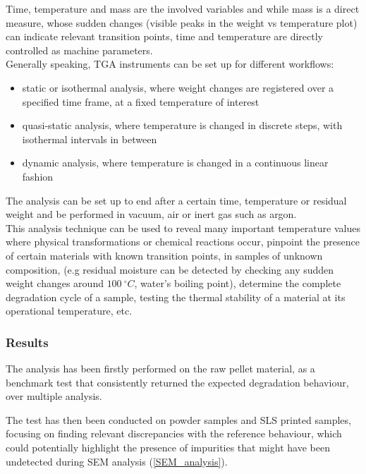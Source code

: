 \documentclass{article}
\begin{document}
        Time, temperature and mass are the involved variables and while mass is a direct measure, whose sudden changes (visible peaks
        in the weight vs temperature plot) can indicate relevant transition points, time and temperature are directly controlled 
        as machine parameters. \\ 

        Generally speaking, TGA instruments can be set up for different workflows: 

                \begin{itemize}
                    \item static or isothermal analysis, where weight changes are registered over a specified time frame, 
                    at a fixed temperature of interest
                    \item quasi-static analysis, where temperature is changed in discrete steps, with isothermal intervals in between 
                    \item dynamic analysis, where temperature is changed in a continuous linear fashion
                \end{itemize}

            The analysis can be set up to end after a certain time, temperature or residual weight and be performed 
            in vacuum, air or inert gas such as argon. \\

        This analysis technique can be used to reveal many important temperature values where physical transformations or chemical 
        reactions occur, pinpoint the presence of certain materials with known transition points, in samples of unknown composition, 
        (e.g residual moisture can be detected by checking any sudden weight changes around $100 \ ^{\circ}C $, water's boiling point), 
        determine the complete degradation cycle of a sample, testing the thermal stability of a material at its operational temperature, etc. \\ 
        
            \subsubsection{Results}

            The analysis has been firstly performed on the raw pellet material, as a benchmark test
            that consistently returned the expected degradation behaviour, over multiple analysis. 

            The test has then been conducted on powder samples and SLS printed samples, focusing on finding relevant 
            discrepancies with the reference behaviour, which could potentially highlight the presence of impurities
            that might have been undetected during SEM analysis (\ref{SEM_analysis}). \\ 
\end{document}
